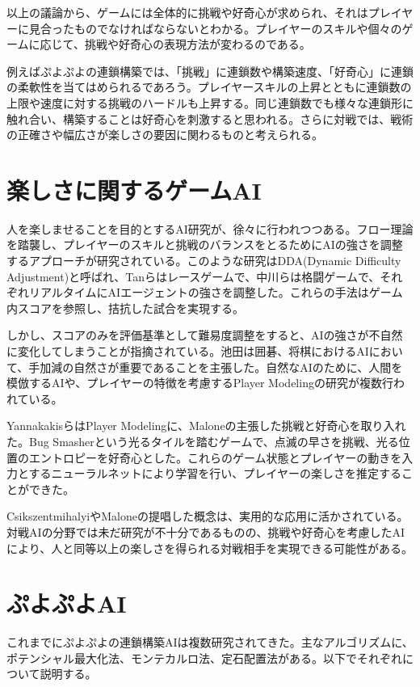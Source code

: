 \documentclass[12pt]{jsarticle}
\begin{document}
以上の議論から、ゲームには全体的に挑戦や好奇心が求められ、それはプレイヤーに見合ったものでなければならないとわかる。プレイヤーのスキルや個々のゲームに応じて、挑戦や好奇心の表現方法が変わるのである。

例えばぷよぷよの連鎖構築では、「挑戦」に連鎖数や構築速度、「好奇心」に連鎖の柔軟性を当てはめられるであろう。プレイヤースキルの上昇とともに連鎖数の上限や速度に対する挑戦のハードルも上昇する。同じ連鎖数でも様々な連鎖形に触れ合い、構築することは好奇心を刺激すると思われる。さらに対戦では、戦術の正確さや幅広さが楽しさの要因に関わるものと考えられる。

\section{楽しさに関するゲームAI}
人を楽しませることを目的とするAI研究が、徐々に行われつつある。フロー理論を踏襲し、プレイヤーのスキルと挑戦のバランスをとるためにAIの強さを調整するアプローチが研究されている。このような研究はDDA(Dynamic Difficulty Adjustment)と呼ばれ、Tanら\cite{DDA_race}はレースゲームで、中川ら\cite{DDA_fight}は格闘ゲームで、それぞれリアルタイムにAIエージェントの強さを調整した。これらの手法はゲーム内スコアを参照し、拮抗した試合を実現する。

しかし、スコアのみを評価基準として難易度調整をすると、AIの強さが不自然に変化してしまうことが指摘されている。池田\cite{ikeda}は囲碁、将棋におけるAIにおいて、手加減の自然さが重要であることを主張した。自然なAIのために、人間を模倣するAIや、プレイヤーの特徴を考慮するPlayer Modelingの研究が複数行われている\cite{yan_panorama, adaptive}。

Yannakakisら\cite{yan_adaptive}はPlayer Modelingに、Maloneの主張した挑戦と好奇心を取り入れた。Bug Smasherという光るタイルを踏むゲームで、点滅の早さを挑戦、光る位置のエントロピーを好奇心とした。これらのゲーム状態とプレイヤーの動きを入力とするニューラルネットにより学習を行い、プレイヤーの楽しさを推定することができた。

CsikszentmihalyiやMaloneの提唱した概念は、実用的な応用に活かされている。対戦AIの分野では未だ研究が不十分であるものの、挑戦や好奇心を考慮したAIにより、人と同等以上の楽しさを得られる対戦相手を実現できる可能性がある。

\section{ぷよぷよAI}
これまでにぷよぷよの連鎖構築AIは複数研究されてきた。主なアルゴリズムに、ポテンシャル最大化法、モンテカルロ法、定石配置法がある。以下でそれぞれについて説明する。
\end{document}
